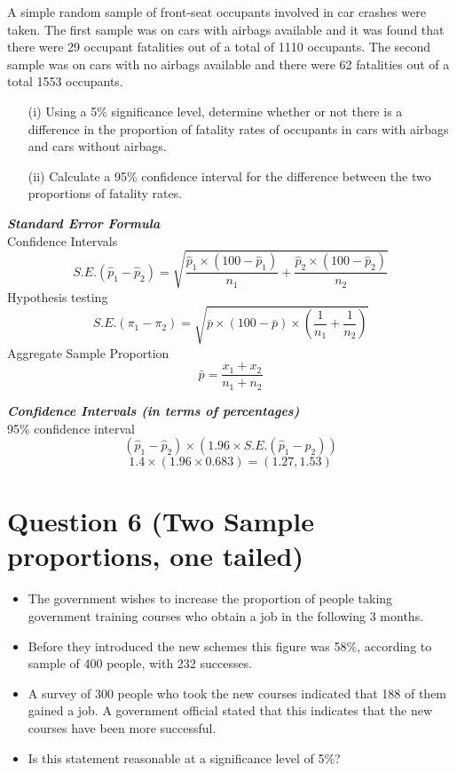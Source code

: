 \documentclass[]{report}
\begin{document}
\begin{enumerate}
	A simple random sample of front-seat occupants involved in car crashes were taken. 
	The first sample was on cars with airbags available and it was found that there were 29 occupant fatalities out of a total of 1110 occupants. The second sample was on cars with no airbags available and
	there were 62 fatalities out of a total 1553 occupants.
	\begin{itemize}
		\item[(i)] Using a 5\% significance level, determine whether or not there is a difference in the proportion of fatality rates of occupants in cars with airbags and cars without airbags.
		\item[(ii)] Calculate a 95\% confidence interval for the difference between the two proportions of fatality rates.
	\end{itemize}
	
	\noindent \textbf{\textit{Standard Error Formula }}\\
	Confidence Intervals
	\[ S.E.(\hat{p}_1 - \hat{p}_2)  = \sqrt{\frac{\hat{p}_1 \times (100 - \hat{p}_1)}{n_1} + \frac{\hat{p}_2 \times (100 - \hat{p}_2)}{n_2}} \]
	Hypothesis testing
	\[ S.E.(\pi_1 - \pi_2)  = \sqrt{\bar{p} \times (100 - \bar{p}) \times \left( \frac{1}{n_1} + \frac{1}{n_2}\right)} \]
	Aggregate Sample Proportion
	\[  \bar{p} = \frac{x_1+x_2}{n_1+n_2} \]
	
	
	\noindent \textbf{\textit{Confidence Intervals (in terms of percentages) }}\\
	95\% confidence interval
	\[ (\hat{p}_1 - \hat{p}_2 ) \times (1.96 \times S.E.(\hat{p}_1 - \hat{p}_2))\]
	\[ 1.4 \times (1.96 \times 0.683) =  (1.27,1.53)\]
	\normalsize
	\section*{Question 6 (Two Sample proportions, one tailed)}
	\begin{itemize}
		\item The government wishes to increase the proportion of people taking government training courses who obtain a job in the following 3 months. \item Before they introduced the new schemes this figure was 58\%, according to sample of 400 people, with 232 successes. \item A survey of 300 people who took the new courses indicated that 188 of them gained a job. A government official stated that this indicates that the new courses have been more successful. \item Is this statement reasonable at a significance level of 5\%?
	\end{itemize}
	

\end{enumerate}
\end{document}
